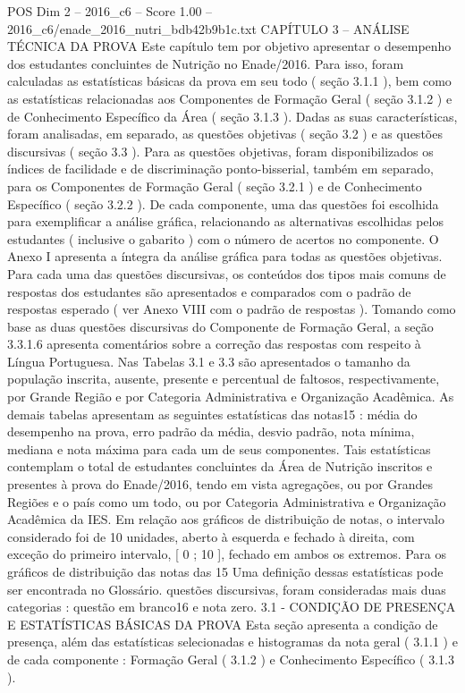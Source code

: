 \begin{textsample}{POS Dim 2 – 2016\_c6 – Score 1.00 – 2016\_c6/enade\_2016\_nutri\_bdb42b9b1c.txt}  \label{ex:f2_pos_208}
CAPÍTULO 3 – ANÁLISE TÉCNICA DA PROVA Este capítulo tem por objetivo apresentar o desempenho dos estudantes concluintes de Nutrição no Enade/2016.
Para isso, foram calculadas as estatísticas básicas da prova em seu todo ( seção 3.1.1 ), bem como as estatísticas relacionadas aos Componentes de Formação Geral ( seção 3.1.2 ) e de Conhecimento Específico da Área ( seção 3.1.3 ).
Dadas as suas características, foram analisadas, em separado, as questões objetivas ( seção 3.2 ) e as questões discursivas ( seção 3.3 ).
Para as questões objetivas, foram disponibilizados os índices de facilidade e de discriminação ponto-bisserial, também em separado, para os Componentes de Formação Geral ( seção 3.2.1 ) e de Conhecimento Específico ( seção 3.2.2 ).
De cada componente, uma das questões foi escolhida para exemplificar a análise gráfica, relacionando as alternativas escolhidas pelos estudantes ( inclusive o gabarito ) com o número de acertos no componente.
O Anexo I apresenta a íntegra da análise gráfica para todas as questões objetivas.
Para cada uma das questões discursivas, os conteúdos dos tipos mais comuns de respostas dos estudantes são apresentados e comparados com o padrão de respostas esperado ( ver Anexo VIII com o padrão de respostas ).
Tomando como base as duas questões discursivas do Componente de Formação Geral, a seção 3.3.1.6 apresenta comentários sobre a correção das respostas com respeito à Língua Portuguesa.
Nas Tabelas 3.1 e 3.3 são apresentados o tamanho da população inscrita, ausente, presente e percentual de faltosos, respectivamente, por Grande Região e por Categoria Administrativa e Organização Acadêmica.
As demais tabelas apresentam as seguintes estatísticas das notas15 : média do desempenho na prova, erro padrão da média, desvio padrão, nota mínima, mediana e nota máxima para cada um de seus componentes.
Tais estatísticas contemplam o total de estudantes concluintes da Área de Nutrição inscritos e presentes à prova do Enade/2016, tendo em vista agregações, ou por Grandes Regiões e o país como um todo, ou por Categoria Administrativa e Organização Acadêmica da IES.
Em relação aos gráficos de distribuição de notas, o intervalo considerado foi de 10 unidades, aberto à esquerda e fechado à direita, com exceção do primeiro intervalo, [ 0 ; 10 ], fechado em ambos os extremos.
Para os gráficos de distribuição das notas das 15 Uma definição dessas estatísticas pode ser encontrada no Glossário. questões discursivas, foram consideradas mais duas categorias : questão em branco16 e nota zero. 3.1 - CONDIÇÃO DE PRESENÇA E ESTATÍSTICAS BÁSICAS DA PROVA Esta seção apresenta a condição de presença, além das estatísticas selecionadas e histogramas da nota geral ( 3.1.1 ) e de cada componente : Formação Geral ( 3.1.2 ) e Conhecimento Específico ( 3.1.3 ).

\end{textsample}
